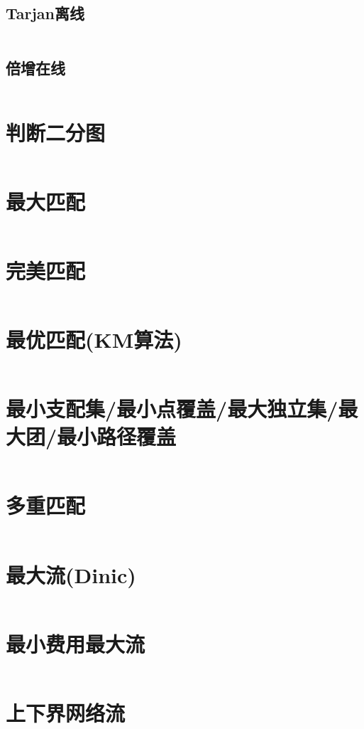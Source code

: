 \documentclass[a4paper,11pt]{article}
\begin{document}
\subsection*{Tarjan离线}
\inputminted[]{c++}{Template/TreeGraph/LCA-Tarjan.cpp}
\subsection*{倍增在线}
\inputminted[]{c++}{Template/TreeGraph/LCA-Mul.cpp}

\newpage
\section*{判断二分图}
\inputminted[]{c++}{Template/NetworkFlow/BinaryJudge.cpp}
\section*{最大匹配}
\inputminted[]{c++}{Template/NetworkFlow/MaximumMatch.cpp}
\section*{完美匹配}
\inputminted[]{c++}{Template/NetworkFlow/PerfectMatch.cpp}
\section*{最优匹配(KM算法)}
\inputminted[]{c++}{Template/NetworkFlow/KM.cpp}
\section*{最小支配集/最小点覆盖/最大独立集/最大团/最小路径覆盖}
\inputminted[]{c++}{Template/NetworkFlow/SetPro.cpp}
\section*{多重匹配}
\inputminted[]{c++}{Template/NetworkFlow/MultiMatch.cpp}
\section*{最大流(Dinic)}
\inputminted[]{c++}{Template/NetworkFlow/Dinic.cpp}
\section*{最小费用最大流}
\inputminted[]{c++}{Template/NetworkFlow/mcmf.cpp}
\section*{上下界网络流}
\inputminted[]{c++}{Template/NetworkFlow/UpDownFlow.cpp}
\end{document}
